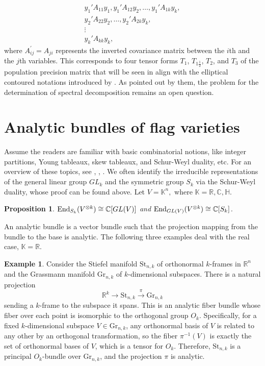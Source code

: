 \documentclass{amsart}
\newtheorem{proposition}[theorem]{Proposition}
\theoremstyle{definition}
\newtheorem{example}[theorem]{Example}
\numberwithin{equation}{section}
\begin{document}
\begin{equation}
    \begin{aligned}
        {y}_1'{A}_{11}{y}_1, {y}_1'{A}_{12}{y}_2, \dots, {y}_1'{A}_{1k}{y}_k,\\
        {y}_2'{A}_{22}{y}_2, \dots, {y}_2'{A}_{2k}{y}_k, \\
        \vdots\qquad \\
        {y}_k'{A}_{kk}{y}_k,
    \end{aligned}
    \label{eq: illustration of triangular ararry heter}
\end{equation}
where $A_{ij}^{\prime} =  A_{ji}$ represents the inverted covariance matrix between the $i$th and the $j$th variables. This corresponds to four tensor forms $T_{1}$, $T_{1\frac{1}{2}}$, $T_{2}$, and $T_{3}$ of the population precision matrix that will be seen in align with the elliptical contoured notations introduced by \cite{1990Generalized}. As pointed out by them, the problem for the determination of spectral decomposition remains an open question. 


\section{Analytic bundles of flag varieties}

Assume the readers are familiar with basic combinatorial notions, like integer partitions, Young tableaux, skew tableaux, and Schur-Weyl duality, etc. For an overview of these topics, see \cite{fulton1997young}, \cite{macdonald1998symmetric}, \cite{goodman2009gtm255}. We often identify the irreducible representations of the general linear group $GL_k$ and the symmetric group $S_k$ via the Schur-Weyl duality, whose proof can be found above. Let $V = \mathbb K^n,$ where $ \mathbb K = \mathbb R, \mathbb C, \mathbb H.$

\begin{proposition} ${\rm End}_{S_k}(V^{\otimes k}) \cong \mathbb{C}[GL(V)]$ and ${\rm End}_{GL(V)}(V^{\otimes k}) \cong \mathbb{C}[S_k]$. 
\end{proposition}

An analytic bundle is a vector bundle such that the projection mapping from the bundle to the base is analytic. The following three examples deal with the real case, $\mathbb K = \mathbb R$.

\begin{example}
Consider the Stiefel manifold $\mathrm{St}_{n,k}$ of orthonormal $k$-frames in $\mathbb{R}^n$ and the Grassmann manifold $\mathrm{Gr}_{n,k}$ of $k$-dimensional subspaces. There is a natural projection 
\[
\mathbb{R}^k \to \mathrm{St}_{n,k} \overset{\pi}{\to} \mathrm{Gr}_{n,k}
\]
sending a $k$-frame to the subspace it spans. This is an analytic fiber bundle whose fiber over each point is isomorphic to the orthogonal group $O_{k}$. Specifically, for a fixed $k$-dimensional subspace $V \in \mathrm{Gr}_{n,k}$, any orthonormal basis of $V$ is related to any other by an orthogonal transformation, so the fiber $\pi^{-1}(V)$ is exactly the set of orthonormal bases of $V$, which is a tensor for $O_{k}$. Therefore, $\mathrm{St}_{n,k}$ is a principal $O_{k}$-bundle over $\mathrm{Gr}_{n,k}$, and the projection $\pi$ is analytic.
\end{example}
\end{document}
